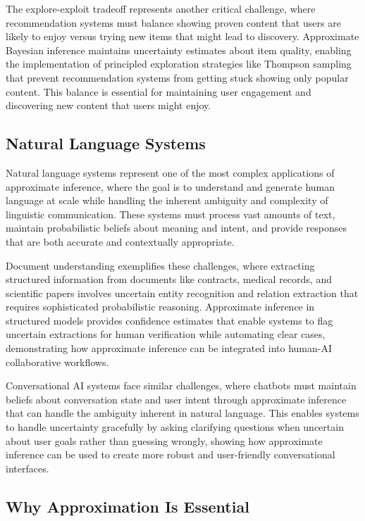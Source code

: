 The explore-exploit tradeoff represents another critical challenge, where recommendation systems must balance showing proven content that users are likely to enjoy versus trying new items that might lead to discovery. Approximate Bayesian inference maintains uncertainty estimates about item quality, enabling the implementation of principled exploration strategies like Thompson sampling that prevent recommendation systems from getting stuck showing only popular content. This balance is essential for maintaining user engagement and discovering new content that users might enjoy.

\subsection{Natural Language Systems}

Natural language systems represent one of the most complex applications of approximate inference, where the goal is to understand and generate human language at scale while handling the inherent ambiguity and complexity of linguistic communication. These systems must process vast amounts of text, maintain probabilistic beliefs about meaning and intent, and provide responses that are both accurate and contextually appropriate.

Document understanding exemplifies these challenges, where extracting structured information from documents like contracts, medical records, and scientific papers involves uncertain entity recognition and relation extraction that requires sophisticated probabilistic reasoning. Approximate inference in structured models provides confidence estimates that enable systems to flag uncertain extractions for human verification while automating clear cases, demonstrating how approximate inference can be integrated into human-AI collaborative workflows.

Conversational AI systems face similar challenges, where chatbots must maintain beliefs about conversation state and user intent through approximate inference that can handle the ambiguity inherent in natural language. This enables systems to handle uncertainty gracefully by asking clarifying questions when uncertain about user goals rather than guessing wrongly, showing how approximate inference can be used to create more robust and user-friendly conversational interfaces.

\subsection{Why Approximation Is Essential}

